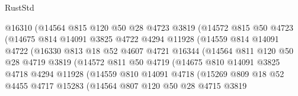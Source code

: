\begin{lexlean}{RustStd}
\begin{coremodule}
                      @16310
                      (@14564
                        @815
                        @120
                        @50
                        @28
                        @4723
                        @3819
                        (@14572
                          @815
                          @50
                          @4723
                          (@14675
                            @814
                            @14091
                            @3825
                            @4722
                            @4294
                            @11928
                            (@14559
                              @814
                              @14091
                              @4722
                              (@16330
                                @813
                                @18
                                @52
                                @4607
                                @4721
                                @16344
                                (@14564
                                  @811
                                  @120
                                  @50
                                  @28
                                  @4719
                                  @3819
                                  (@14572
                                    @811
                                    @50
                                    @4719
                                    (@14675
                                      @810
                                      @14091
                                      @3825
                                      @4718
                                      @4294
                                      @11928
                                      (@14559
                                        @810
                                        @14091
                                        @4718
                                        (@15269
                                          @809
                                          @18
                                          @52
                                          @4455
                                          @4717
                                          @15283
                                          (@14564
                                            @807
                                            @120
                                            @50
                                            @28
                                            @4715
                                            @3819

\end{coremodule}
\end{lexlean}
